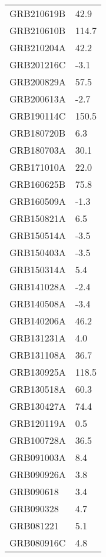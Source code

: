 \begin{tabular}{ll}
\toprule
\midrule
GRB210619B & 42.9 \\
GRB210610B & 114.7 \\
GRB210204A & 42.2 \\
GRB201216C & -3.1 \\
GRB200829A & 57.5 \\
GRB200613A & -2.7 \\
GRB190114C & 150.5 \\
GRB180720B & 6.3 \\
GRB180703A & 30.1 \\
GRB171010A & 22.0 \\
GRB160625B & 75.8 \\
GRB160509A & -1.3 \\
GRB150821A & 6.5 \\
GRB150514A & -3.5 \\
GRB150403A & -3.5 \\
GRB150314A & 5.4 \\
GRB141028A & -2.4 \\
GRB140508A & -3.4 \\
GRB140206A & 46.2 \\
GRB131231A & 4.0 \\
GRB131108A & 36.7 \\
GRB130925A & 118.5 \\
GRB130518A & 60.3 \\
GRB130427A & 74.4 \\
GRB120119A & 0.5 \\
GRB100728A & 36.5 \\
GRB091003A & 8.4 \\
GRB090926A & 3.8 \\
GRB090618 & 3.4 \\
GRB090328 & 4.7 \\
GRB081221 & 5.1 \\
GRB080916C & 4.8 \\
\bottomrule
\end{tabular}

